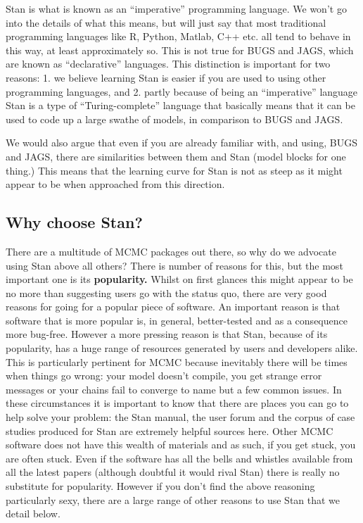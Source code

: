 \documentclass[11pt,fullpage]{book}
\begin{document}
Stan is what is known as an ``imperative'' programming language. We won't go into the details of what this means, but will just say that most traditional programming languages like R, Python, Matlab, C++ etc. all tend to behave in this way, at least approximately so. This is not true for BUGS and JAGS, which are known as ``declarative'' languages. This distinction is important for two reasons: 1. we believe learning Stan is easier if you are used to using other programming languages, and 2. partly because of being an ``imperative'' language Stan is a type of ``Turing-complete'' language that basically means that it can be used to code up a large swathe of models, in comparison to BUGS and JAGS.

We would also argue that even if you are already familiar with, and using, BUGS and JAGS, there are similarities between them and Stan (model blocks for one thing.) This means that the learning curve for Stan is not as steep as it might appear to be when approached from this direction.

\subsection{Why choose Stan?}
There are a multitude of MCMC packages out there, so why do we advocate using Stan above all others? There is number of reasons for this, but the most important one is its \textbf{popularity.} Whilst on first glances this might appear to be no more than suggesting users go with the status quo, there are very good reasons for going for a popular piece of software. An important reason is that software that is more popular is, in general, better-tested and as a consequence more bug-free. However a more pressing reason is that Stan, because of its popularity, has a huge range of resources generated by users and developers alike. This is particularly pertinent for MCMC because inevitably there will be times when things go wrong: your model doesn't compile, you get strange error messages or your chains fail to converge to name but a few common issues. In these circumstances it is important to know that there are places you can go to help solve your problem: the Stan manual, the user forum and the corpus of case studies produced for Stan are extremely helpful sources here. Other MCMC software does not have this wealth of materials and as such, if you get stuck, you are often stuck. Even if the software has all the bells and whistles available from all the latest papers (although doubtful it would rival Stan) there is really no substitute for popularity. However if you don't find the above reasoning particularly sexy, there are a large range of other reasons to use Stan that we detail below.
\end{document}

